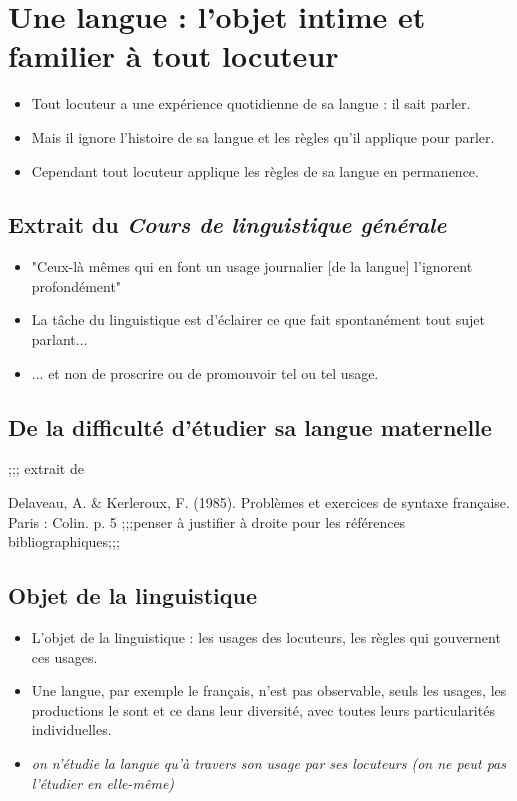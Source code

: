 \section{Une langue : l'objet intime et familier à tout locuteur}
\begin{itemize}
   \item Tout locuteur a une expérience quotidienne de sa langue : il sait parler.
   \item Mais il ignore l'histoire de sa langue et les règles qu'il applique pour parler.
   \item Cependant tout locuteur applique les règles de sa langue en permanence.
\end{itemize}

\subsection{Extrait du \textit{Cours de linguistique générale}}
\begin{itemize}
   \item "Ceux-là mêmes qui en font un usage journalier [de la langue] l'ignorent profondément"
   \item La tâche du linguistique est d'éclairer ce que fait spontanément tout sujet parlant...
   \item ... et non de proscrire ou de promouvoir tel ou tel usage.
\end{itemize}

\subsection{De la difficulté d'étudier sa langue maternelle}
;;; extrait de 

Delaveau, A. \& Kerleroux, F. (1985). Problèmes et exercices de syntaxe française. Paris : Colin. p. 5 ;;;penser à justifier à droite pour les références bibliographiques;;;

\subsection{Objet de la linguistique}
\begin{itemize}
   \item L'objet de la linguistique : les usages des locuteurs,  les règles qui gouvernent ces usages.
   \item Une langue, par exemple le français, n'est pas observable, seuls les usages, les productions le sont et ce dans leur diversité, avec toutes leurs particularités individuelles.
   \item \textit{on n'étudie la langue qu'à travers son usage par ses locuteurs (on ne peut pas l'étudier en elle-même)}
\end{itemize}

